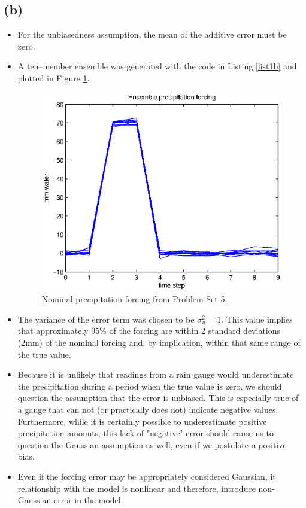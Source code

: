 \documentclass[letterpaper]{tufte-handout}
\begin{document}
\subsection{(b)}
\begin{itemize}
  \item For the unbiasedness assumption, the mean of the additive error must be zero.
  \item A ten--member ensemble was generated with the code in Listing \ref{list1b} and plotted in Figure \ref{1b}.
    {\small
    
  }
    \begin{figure}
      \includegraphics[width=\textwidth]{1b}
      \caption{Nominal precipitation forcing from Problem Set 5.}
      \label{1b}
    \end{figure}
  \item The variance of the error term was chosen to be $\sigma^2_u = 1$. This value implies that approximately 95\% of the forcing are within 2 standard deviations (2mm) of the nominal forcing and, by implication, within that same range of the true value. 
  \item Because it is unlikely that readings from a rain gauge would underestimate the precipitation during a period when the true value is zero, we should question the assumption that the error is unbiased.
    This is especially true of a gauge that can not (or practically does not) indicate negative values. Furthermore, while it is certainly possible to underestimate positive precipitation amounts, this lack of "negative" error should cause us to question the Gaussian assumption as well, even if we postulate a positive bias.
  \item Even if the forcing error may be appropriately considered Gaussian, it relationship with the model is nonlinear and therefore, introduce non-Gaussian error in the model.
\end{itemize}
\end{document}
